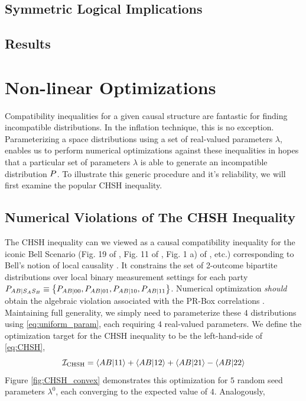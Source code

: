 \documentclass[aps, 10pt, english, twoside, pra, nofootinbib, longbibliography]{revtex4-1}
\theoremstyle{plain}
\theoremstyle{definition}
\theoremstyle{remark}
\begin{document}
    \subsection{Symmetric Logical Implications}
    \subsection{Results}

    \section{Non-linear Optimizations}
    \label{sec:optimizations}
    Compatibility inequalities for a given causal structure are fantastic for finding incompatible distributions. In the inflation technique, this is no exception. Parameterizing a space distributions using a set of real-valued parameters $\lambda$, enables us to perform numerical optimizations against these inequalities in hopes that a particular set of parameters $\lambda$ is able to generate an incompatible distribution $\prob$. To illustrate this generic procedure and it's reliability, we will first examine the popular CHSH inequality.
    \subsection{Numerical Violations of The CHSH Inequality}
    The CHSH inequality \cite{CHSH_Original} can we viewed as a causal compatibility inequality for the iconic Bell Scenario (Fig. 19 of \cite{Wood_2012}, Fig. 11 of \cite{Inflation}, Fig. 1 a) of \cite{Tavakoli_2015}, etc.) corresponding to Bell's notion of local causality \cite{Wood_2012}. It constrains the set of 2-outcome bipartite distributions over local binary measurement settings for each party $\prob[AB\mid S_A S_B] \defined \bc{\prob[AB\mid 0 0], \prob[AB\mid 01], \prob[AB\mid 10], \prob[AB\mid 11]}$. Numerical optimization \textit{should} obtain the algebraic violation associated with the PR-Box correlations \cite{PR_1995}. Maintaining full generality, we simply need to parameterize these $4$ distributions using \cref{eq:uniform_param}, each requiring $4$ real-valued parameters. We define the optimization target for the CHSH inequality to be the left-hand-side of \cref{eq:CHSH},
    \[ \mathcal{I}_\text{CHSH} = \left< AB|11 \right> + \left< AB|12 \right> + \left< AB|21 \right> - \left< AB|22 \right> \]
    Figure \ref{fig:CHSH_convex} demonstrates this optimization for $5$ random seed parameters $\lambda^0$, each converging to the expected value of $4$. Analogously, \cite{Cirelson_1980}
\end{document}
